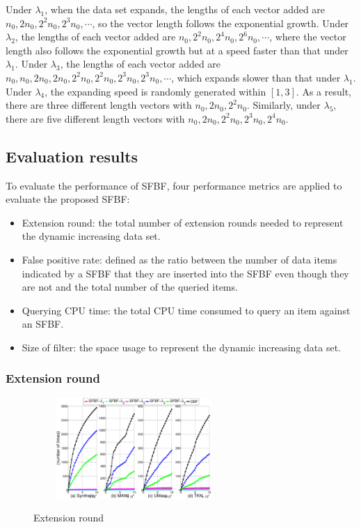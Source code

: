 \documentclass[10pt,journal,compsoc]{IEEEtran}
\begin{document}
Under  $\lambda_1$, when the data set expands, the lengths of each vector added are  ${n_0},2{n_0},{2^2}{n_0},{2^3}{n_0}, \cdots$, so the vector length follows the exponential growth. Under  $\lambda_2$, the lengths of each vector added are  ${n_0},{2^2}{n_0},{2^4}{n_0}, {2^6}{n_0},\cdots$, where the vector length also follows the exponential growth but at a speed faster than that under $\lambda_1$. Under  $\lambda_3$, the lengths of each vector added are  ${n_0},{n_0}, 2{n_0},2{n_0},{2^2}{n_0},{2^2}{n_0},{2^3}{n_0}, {2^3}{n_0},\cdots$, which expands slower than that under  $\lambda_1$.  Under $\lambda_4$, the expanding speed is randomly generated within $[1,3]$. As a result, there are three different length vectors with  ${n_0},2{n_0},{2^2}{n_0}$. Similarly, under $\lambda_5$, there are five different length vectors with  ${n_0},2{n_0},{2^2}{n_0},{2^3}{n_0},{2^4}{n_0}$.
\subsection{Evaluation results}

To evaluate the performance of SFBF, four performance metrics are applied to evaluate the proposed SFBF:
\begin{itemize}
  \item  Extension round: the total number of extension rounds needed to represent the dynamic increasing data set.
  \item  False positive rate: defined as the ratio between the number
of data items indicated by a SFBF that they are inserted into the SFBF
even though they are not and the total number of the queried items.
  \item  Querying CPU time: the total CPU time consumed to query an item against an SFBF.
  \item Size of filter: the space usage to represent the dynamic increasing data set.
\end{itemize}

\subsubsection{Extension round}

\begin{figure}[!h]
\center

  \includegraphics[width=3in,height=1.5in]{franztao20161209/p2_ExtensionRound}\\

\caption{Extension round}
\label{fig:Extension round.}
\end{figure}
\end{document}
